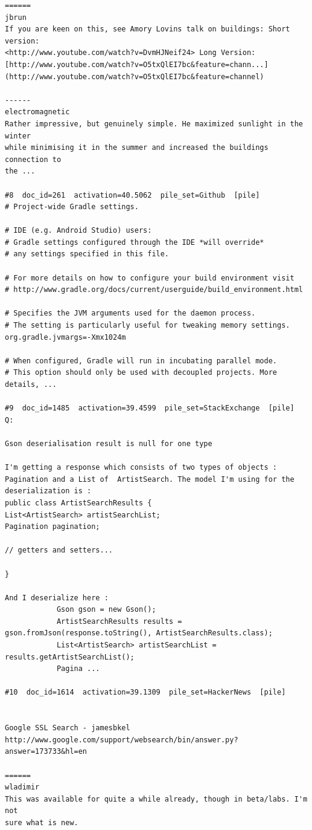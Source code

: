 \begin{verbatim}
======
jbrun
If you are keen on this, see Amory Lovins talk on buildings: Short version:
<http://www.youtube.com/watch?v=DvmHJNeif24> Long Version:
[http://www.youtube.com/watch?v=O5txQlEI7bc&feature=chann...](http://www.youtube.com/watch?v=O5txQlEI7bc&feature=channel)

------
electromagnetic
Rather impressive, but genuinely simple. He maximized sunlight in the winter
while minimising it in the summer and increased the buildings connection to
the ...

#8  doc_id=261  activation=40.5062  pile_set=Github  [pile]
# Project-wide Gradle settings.

# IDE (e.g. Android Studio) users:
# Gradle settings configured through the IDE *will override*
# any settings specified in this file.

# For more details on how to configure your build environment visit
# http://www.gradle.org/docs/current/userguide/build_environment.html

# Specifies the JVM arguments used for the daemon process.
# The setting is particularly useful for tweaking memory settings.
org.gradle.jvmargs=-Xmx1024m

# When configured, Gradle will run in incubating parallel mode.
# This option should only be used with decoupled projects. More details, ...

#9  doc_id=1485  activation=39.4599  pile_set=StackExchange  [pile]
Q:

Gson deserialisation result is null for one type

I'm getting a response which consists of two types of objects : Pagination and a List of  ArtistSearch. The model I'm using for the deserialization is : 
public class ArtistSearchResults {
List<ArtistSearch> artistSearchList;
Pagination pagination;

// getters and setters...

}

And I deserialize here : 
            Gson gson = new Gson();
            ArtistSearchResults results = gson.fromJson(response.toString(), ArtistSearchResults.class);
            List<ArtistSearch> artistSearchList = results.getArtistSearchList();
            Pagina ...

#10  doc_id=1614  activation=39.1309  pile_set=HackerNews  [pile]


Google SSL Search - jamesbkel
http://www.google.com/support/websearch/bin/answer.py?answer=173733&hl=en

======
wladimir
This was available for quite a while already, though in beta/labs. I'm not
sure what is new.


\end{verbatim}
